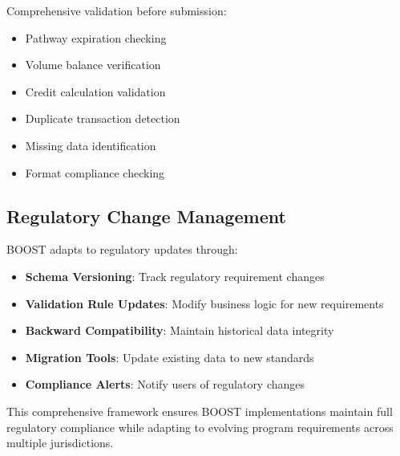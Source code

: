 Comprehensive validation before submission:

\begin{itemize}
    \item Pathway expiration checking
    \item Volume balance verification
    \item Credit calculation validation
    \item Duplicate transaction detection
    \item Missing data identification
    \item Format compliance checking
\end{itemize}

\subsection{Regulatory Change Management}
\label{sec:regulatory-changes}

BOOST adapts to regulatory updates through:

\begin{itemize}
    \item \textbf{Schema Versioning}: Track regulatory requirement changes
    \item \textbf{Validation Rule Updates}: Modify business logic for new requirements
    \item \textbf{Backward Compatibility}: Maintain historical data integrity
    \item \textbf{Migration Tools}: Update existing data to new standards
    \item \textbf{Compliance Alerts}: Notify users of regulatory changes
\end{itemize}

This comprehensive framework ensures BOOST implementations maintain full regulatory compliance while adapting to evolving program requirements across multiple jurisdictions.